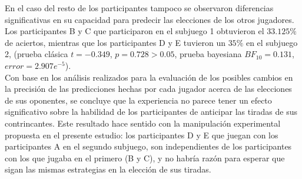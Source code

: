En el caso del resto de los participantes tampoco se observaron diferencias significativas en su capacidad para predecir las elecciones de los otros jugadores. Los participantes B y C que participaron en el subjuego 1 obtuvieron el $33.125\%$ de aciertos, mientras que los participantes D y E tuvieron un $35\%$ en el subjuego 2,  (prueba clásica $t = -0.349$, $p = 0.728 > 0.05$, prueba bayesiana $BF_{10} = 0.131$, $error = 2.907e^{-5}$).\\

Con base en los análisis realizados para la evaluación de los posibles cambios en la precisión de las predicciones hechas por cada jugador acerca de las elecciones de sus oponentes, se concluye que la experiencia no parece tener un efecto significativo sobre la habilidad de los participantes de anticipar las tiradas de sus contrincantes. Este resultado hace sentido con la manipulación experimental propuesta en el presente estudio: los participantes D y E que juegan con los participantes A en el segundo subjuego, son independientes de los participantes con los que jugaba en el primero (B y C), y no habría razón para esperar que sigan las mismas estrategias en la elección de sus tiradas.\\
